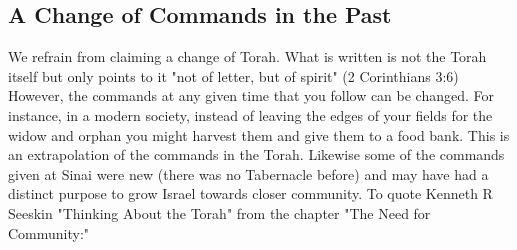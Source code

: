 \documentclass[11pt]{article}
\begin{document}
\subsection{A Change of Commands in the Past} \label{a change of commands in the past}
We refrain from claiming a change of Torah. What is written is not the Torah itself but only points to it "not of letter, but of spirit" (2 Corinthians 3:6) However, the commands at any given time that you follow can be changed. For instance, in a modern society, instead of leaving the edges of your fields for the widow and orphan you might harvest them and give them to a food bank. This is an extrapolation of the commands in the Torah. Likewise some of the commands given at Sinai were new (there was no Tabernacle before) and may have had a distinct purpose to grow Israel towards closer community. To quote Kenneth R Seeskin "Thinking About the Torah" from the chapter "The Need for Community:" 
\end{document}
